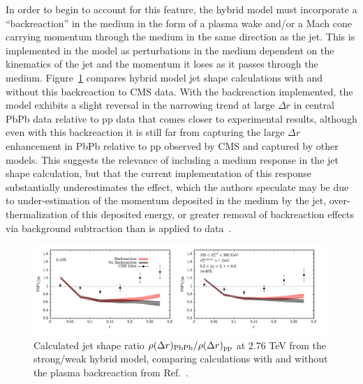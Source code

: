 In order to begin to account for this feature, the hybrid model must incorporate a ``backreaction'' in the medium in the form of a plasma wake and/or a Mach cone carrying momentum through the medium in the same direction as the jet.  This is implemented in the model as perturbations in the medium dependent on the kinematics of the jet and the momentum it loses as it passes through the medium.  Figure~\ref{fig:Hybrid_JetShapes2} compares hybrid model jet shape calculations with and without this backreaction to CMS data.  With the backreaction implemented, the model exhibits a slight reversal in the narrowing trend at large $\Delta r$ in central PbPb data relative to pp data that comes closer to experimental results, although even with this backreaction it is still far from capturing the large $\Delta r$ enhancement in PbPb relative to pp observed by CMS and captured by other models.  This suggests the relevance of including a medium response in the jet shape calculation, but that the current implementation of this response substantially underestimates the effect, which the authors speculate may be due to under-estimation of the momentum deposited in the medium by the jet, over-thermalization of this deposited energy, or greater removal of backreaction effects via background subtraction than is applied to data~\cite{Casalderrey-Solana:2016jvj}.



\begin{figure}[ht!]
\begin{center}
\includegraphics[width=0.99\textwidth]{figures/Models/Hybrid_JetShapes2.png}
\caption[Calculated jet shape ratio $\rho(\Delta r)_{\rm PbPb}/\rho(\Delta r)_{\rm pp}$ at 2.76 TeV from the hybrid model with and without the medium backreaction]{Calculated jet shape ratio $\rho(\Delta r)_{\rm PbPb}/\rho(\Delta r)_{\rm pp}$ at 2.76 TeV from the strong/weak hybrid model, comparing calculations with and without the plasma backreaction from Ref.~\cite{Casalderrey-Solana:2016jvj}.}
\label{fig:Hybrid_JetShapes2}
\end{center}
\end{figure}


